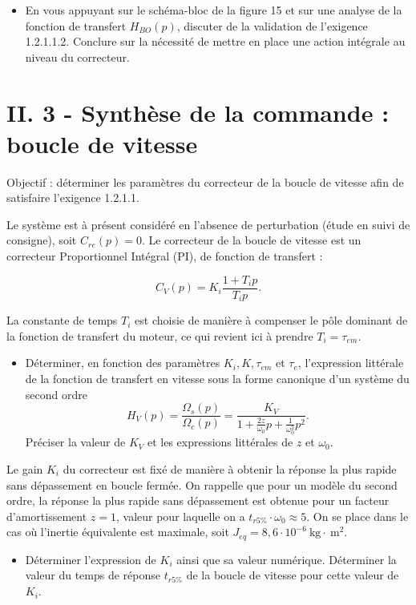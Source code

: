 \begin{itemize}
  \item[Q18.] En vous appuyant sur le schéma-bloc de la figure 15 et sur une analyse de la fonction de transfert $H_{B O}(p)$, discuter de la validation de l'exigence 1.2.1.1.2. Conclure sur la nécessité de mettre en place une action intégrale au niveau du correcteur.
\end{itemize}

\section*{II. 3 - Synthèse de la commande : boucle de vitesse}
Objectif : déterminer les paramètres du correcteur de la boucle de vitesse afin de satisfaire l'exigence 1.2.1.1.

Le système est à présent considéré en l'absence de perturbation (étude en suivi de consigne), soit $C_{r e}(p)=0$. Le correcteur de la boucle de vitesse est un correcteur Proportionnel Intégral (PI), de fonction de transfert :

$$
C_{V}(p)=K_{i} \frac{1+T_{i} p}{T_{i} p} .
$$

La constante de temps $T_{i}$ est choisie de manière à compenser le pôle dominant de la fonction de transfert du moteur, ce qui revient ici à prendre $T_{i}=\tau_{e m}$.

\begin{itemize}
  \item[Q19.] Déterminer, en fonction des paramètres $K_{i}, K, \tau_{e m}$ et $\tau_{e}$, l'expression littérale de la fonction de transfert en vitesse sous la forme canonique d'un système du second ordre
$$
H_{V}(p)=\frac{\Omega_{s}(p)}{\Omega_{c}(p)}=\frac{K_{V}}{1+\frac{2 z}{\omega_{0}} p+\frac{1}{\omega_{0}^{2}} p^{2}} .
$$
Préciser la valeur de $K_{V}$ et les expressions littérales de $z$ et $\omega_{0}$.
\end{itemize}

Le gain $K_{i}$ du correcteur est fixé de manière à obtenir la réponse la plus rapide sans dépassement en boucle fermée. On rappelle que pour un modèle du second ordre, la réponse la plus rapide sans dépassement est obtenue pour un facteur d'amortissement $z=1$, valeur pour laquelle on a $t_{r 5 \%} \cdot \omega_{0} \approx 5$. On se place dans le cas où l'inertie équivalente est maximale, soit $J_{e q}=8,6 \cdot 10^{-6} \mathrm{~kg} \cdot \mathrm{~m}^{2}$.

\begin{itemize}
  \item[Q20.] Déterminer l'expression de $K_{i}$ ainsi que sa valeur numérique. Déterminer la valeur du temps de réponse $t_{r 5 \%}$ de la boucle de vitesse pour cette valeur de $K_{i}$.
\end{itemize}

